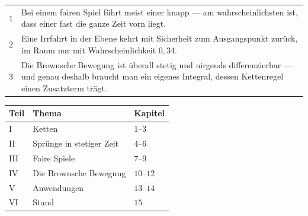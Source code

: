 \begin{merksatz}
\begin{center}
{\small
\renewcommand{\arraystretch}{1.55}
\begin{tabular}{@{}P{1.0cm}P{7.4cm}@{}}
\toprule
$1$ & Bei einem fairen Spiel führt  meist einer knapp --- am wahrscheinlichsten ist, dass einer fast die ganze Zeit vorn liegt. \\
$2$ & Eine Irrfahrt in der Ebene kehrt mit Sicherheit zum Ausgangspunkt zurück, im Raum nur mit Wahrscheinlichkeit $0{,}34$. \\
$3$ & Die Brownsche Bewegung ist überall stetig und nirgends differenzierbar --- und genau deshalb braucht man ein eigenes Integral, dessen Kettenregel einen Zusatzterm trägt. \\
\bottomrule
\end{tabular}}
\end{center}

\begin{center}
\begin{minipage}{0.88\textwidth}
\end{minipage}
\end{center}
\end{merksatz}

\begin{merksatz}
\begin{center}
{\small
\renewcommand{\arraystretch}{1.5}
\begin{tabular}{@{}P{1.4cm}P{3.6cm}P{3.0cm}@{}}
\toprule
\textbf{Teil} & \textbf{Thema} & \textbf{Kapitel}\\
\midrule
I & Ketten & $1$--$3$\\
II & Sprünge in stetiger Zeit & $4$--$6$\\
III & Faire Spiele & $7$--$9$\\
IV & Die Brownsche Bewegung & $10$--$12$\\
V & Anwendungen & $13$--$14$\\
VI & Stand & $15$\\
\bottomrule
\end{tabular}}
\end{center}

\begin{center}
\begin{minipage}{0.88\textwidth}
\end{minipage}
\end{center}
\end{merksatz}

